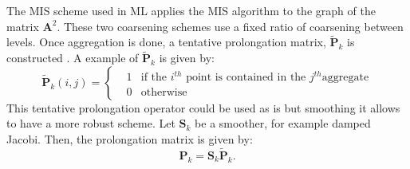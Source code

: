 \documentclass[preprint,10pt]{elsarticle}
\newcommand\bs{\boldsymbol}
\renewcommand{\(}{\left(}
\renewcommand{\)}{\right)}
\renewcommand{\[}{\left[}
\renewcommand{\]}{\right]}
\begin{document}
The MIS scheme used in ML applies the MIS algorithm \cite{graph_coloring} to
the graph of the matrix $\bs{A}^2$. These two coarsening 
schemes use a fixed ratio of coarsening between levels. 
%
Once aggregation is done, a tentative prolongation matrix, $\bs{\tilde{P}}_k$ 
is constructed \cite{mis}. A example of $\bs{\tilde{P}}_k$ is given by:
\begin{equation}
  \bs{\tilde{P}}_k(i,j) = \left\{
  \begin{aligned}
    &1 &\textrm{if the }i^{th}\textrm{ point is contained in the }j^{th}\textrm{
    aggregate}\\
    & 0 &\textrm{otherwise}
  \end{aligned}
  \right.
\end{equation}
This tentative prolongation operator could be used as is but smoothing it
allows to have a more robust scheme. Let $\bs{S}_k$ be a smoother, for example
damped Jacobi. Then, the prolongation matrix is given by:
\begin{equation}
  \bs{P}_k = \bs{S}_k \bs{\tilde{P}}_k.
\end{equation}

\end{document}
